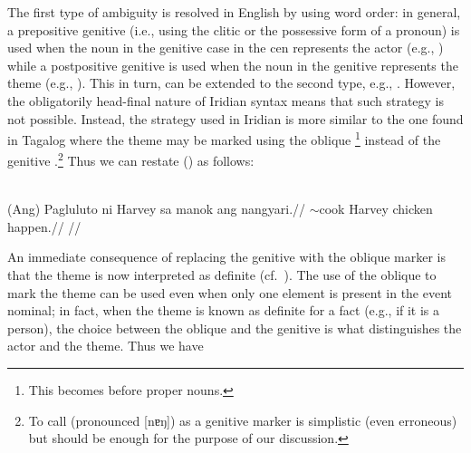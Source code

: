 The first type of ambiguity is resolved in English by using word
order: in general, a prepositive genitive (i.e., using the clitic 
or the possessive form of a pronoun) is used when the noun in the genitive case
in the {\sc cen} represents the actor (e.g., ) while a
postpositive genitive is used when the noun in the genitive represents the theme
(e.g., ). This in turn, can be extended to the
second type, e.g., . However, the
obligatorily head-final nature of Iridian syntax means that such strategy is not
possible. Instead, the strategy used in Iridian is more similar to the one found
in Tagalog where the theme may be marked using the oblique
\footnote{This becomes  before proper nouns.} instead
of the genitive .\footnote{ To call  (pronounced [nɐŋ])
as a genitive marker is simplistic (even erroneous) but should be enough for the
purpose of our discussion. } Thus we can restate ()
as follows:

\\
\begingl
    \gla (Ang) Pagluluto ni Harvey {sa} manok ang nangyari.//
    \glb \Nom{} \Ger{}$\sim$cook \Gen{} Harvey \Obl{} chicken \Nom{} happen.\Pfv{}//
    \glft {}//
\endgl
\xe

An immediate consequence of replacing the genitive  with the oblique
marker  is that the theme is now interpreted as definite
(cf.~\cite[3,\,40]{kaufman2009}). The use of the oblique to mark the theme can
be used even when only one element is present in the event nominal; in fact,
when the theme is known as definite for a fact (e.g., if it is a person), the
choice between the oblique and the genitive is what distinguishes the actor and
the theme. Thus we have

